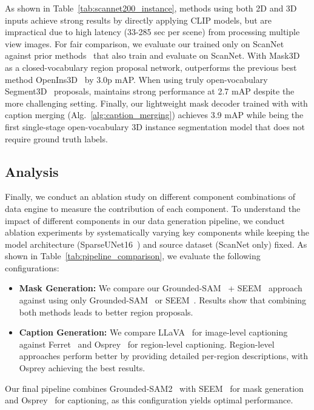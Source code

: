 As shown in Table~\ref{tab:scannet200_instance}, methods using both 2D and 3D inputs achieve strong results by directly applying CLIP models, but are impractical due to high latency (33-285 sec per scene) from processing multiple view images.
For fair comparison, we evaluate our \nickname trained only on ScanNet against prior methods~\cite{huang2024openins3d,takmaz2023openmask3d,yin2024sai3d,nguyen2024open3dis,Peng2023OpenScene,yang2024regionplc} that also train and evaluate on ScanNet.
With Mask3D~\cite{schult2023mask3d} as a closed-vocabulary region proposal network, \nickname outperforms the previous best method OpenIns3D~\cite{huang2024openins3d} by 3.0p mAP.
When using truly open-vocabulary Segment3D~\cite{huang2024segment3d} proposals, \nickname maintains strong performance at 2.7 mAP despite the more challenging setting.
Finally, our lightweight mask decoder trained with \dataname with caption merging (Alg.~\ref{alg:caption_merging}) achieves 3.9 mAP while being the first single-stage open-vocabulary 3D instance segmentation model that does not require ground truth labels.

\subsection{Analysis}
\label{subsec:analysis}



Finally, we conduct an ablation study on different component combinations of \nickname data engine to measure the contribution of each component. 
To understand the impact of different components in our data generation pipeline, we conduct ablation experiments by systematically varying key components while keeping the model architecture (SparseUNet16~\cite{yang2024regionplc}) and source dataset (ScanNet only) fixed.
As shown in Table~\ref{tab:pipeline_comparison}, we evaluate the following configurations:

\begin{itemize}[leftmargin=*,itemsep=1pt]
    \item \textbf{Mask Generation:} We compare our Grounded-SAM~\cite{ren2024grounded} + SEEM~\cite{zou2024segment} approach against using only Grounded-SAM~\cite{ren2024grounded} or SEEM~\cite{zou2024segment}. Results show that combining both methods leads to better region proposals.
    \item \textbf{Caption Generation:} We compare LLaVA~\cite{llava} for image-level captioning against Ferret~\cite{you2023ferret} and Osprey~\cite{yuan2024osprey} for region-level captioning. Region-level approaches perform better by providing detailed per-region descriptions, with Osprey achieving the best results.
\end{itemize}
Our final pipeline combines Grounded-SAM2~\cite{ren2024grounded,ravi2024sam} with SEEM~\cite{zou2024segment} for mask generation and Osprey~\cite{yuan2024osprey} for captioning, as this configuration yields optimal performance.


